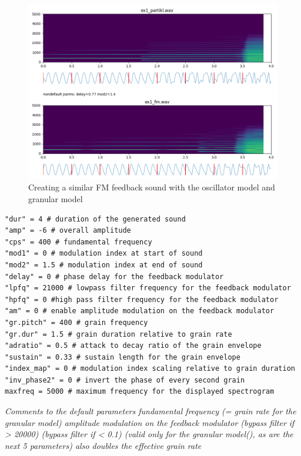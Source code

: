 \documentclass[runningheads,a4paper]{llncs}
\begin{document}
\begin{figure}
	\centering
	\includegraphics[width=.95\textwidth]{ex1_compare.png}
	\caption{Creating a similar FM feedback sound with the oscillator model and granular model}
	\label{fig:ex1}
\end{figure}

\noindent\begin{minipage}{\linewidth}
\begin{lstlisting}[caption=Default parameters for the synthesis models, label=lst:defaultparameters]
"dur" = 4 # duration of the generated sound
"amp" = -6 # overall amplitude
"cps" = 400 # fundamental frequency 
"mod1" = 0 # modulation index at start of sound
"mod2" = 1.5 # modulation index at end of sound
"delay" = 0 # phase delay for the feedback modulator
"lpfq" = 21000 # lowpass filter frequency for the feedback modulator 
"hpfq" = 0 #high pass filter frequency for the feedback modulator 
"am" = 0 # enable amplitude modulation on the feedback modulator
"gr.pitch" = 400 # grain frequency 
"gr.dur" = 1.5 # grain duration relative to grain rate
"adratio" = 0.5 # attack to decay ratio of the grain envelope
"sustain" = 0.33 # sustain length for the grain envelope
"index_map" = 0 # modulation index scaling relative to grain duration
"inv_phase2" = 0 # invert the phase of every second grain
maxfreq = 5000 # maximum frequency for the displayed spectrogram
\end{lstlisting}
\emph{Comments to the default parameters
	fundamental frequency (= grain rate for the granular model)
	amplitude modulation on the feedback modulator
	(bypass filter if > 20000)
	(bypass filter if < 0.1)
	(valid only for the granular model(), as are the next 5 parameters)
	also doubles the effective grain rate}
\end{minipage}
\end{document}
